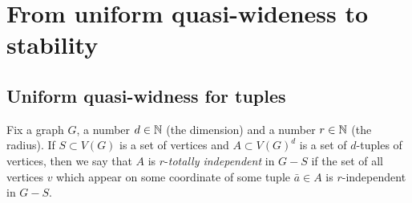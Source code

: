 
\section{From uniform quasi-wideness to stability}\label{sec:stable}

\subsection{Uniform quasi-widness for tuples}
Fix a graph $G$, a number $d\in\mathbb{N}$ (the dimension) and a number $r\in \mathbb{N}$ (the radius).
If $S\subset V(G)$ is a set of vertices and $A\subset V(G)^d$ is a set of $d$-tuples of vertices,
then we say that $A$ is $r$-\emph{totally independent} in $G-S$ 
if the set of all vertices $v$ which appear on some coordinate of some tuple $\bar a\in A$
is $r$-independent in $G-S$. 


